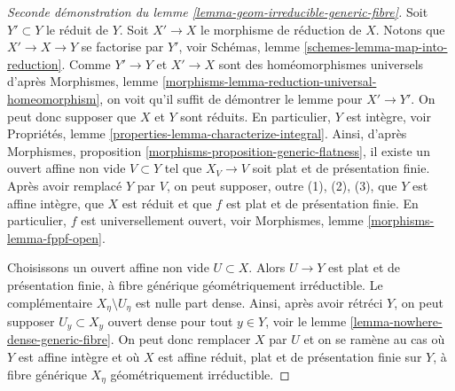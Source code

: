 \begin{proof}[Seconde démonstration du lemme \ref{lemma-geom-irreducible-generic-fibre}]
Soit $Y' \subset Y$ le réduit de $Y$. Soit $X' \to X$ le morphisme de réduction
de $X$. Notons que $X' \to X  \to Y$ se factorise par $Y'$, voir
Schémas, lemme \ref{schemes-lemma-map-into-reduction}.
Comme $Y' \to Y$ et $X' \to X$ sont des homéomorphismes
universels d'après
Morphismes, lemme \ref{morphisms-lemma-reduction-universal-homeomorphism},
on voit qu'il suffit de démontrer le lemme pour $X' \to Y'$. On peut donc
supposer que $X$ et $Y$ sont réduits. En particulier, $Y$ est intègre, voir
Propriétés, lemme \ref{properties-lemma-characterize-integral}.
Ainsi, d'après
Morphismes, proposition \ref{morphisms-proposition-generic-flatness},
il existe un ouvert affine non vide $V \subset Y$ tel que $X_V \to V$ soit
plat et de présentation finie. Après avoir remplacé $Y$ par $V$, on peut
supposer, outre (1), (2), (3), que $Y$ est affine intègre, que $X$
est réduit et que $f$ est plat et de présentation finie. En particulier,
$f$ est universellement ouvert, voir
Morphismes, lemme \ref{morphisms-lemma-fppf-open}.

\medskip\noindent
Choisissons un ouvert affine non vide $U \subset X$. Alors $U \to Y$ est plat et de
présentation finie, à fibre générique géométriquement irréductible.
Le complémentaire $X_\eta \setminus U_\eta$ est nulle part dense. Ainsi, après
avoir rétréci $Y$, on peut supposer $U_y \subset X_y$ ouvert dense pour tout
$y \in Y$, voir le
lemme \ref{lemma-nowhere-dense-generic-fibre}.
On peut donc remplacer $X$ par $U$ et on se ramène au
cas où $Y$ est affine intègre et où $X$ est affine réduit, plat et de présentation
finie sur $Y$, à fibre générique $X_\eta$ géométriquement irréductible.


\end{proof}
